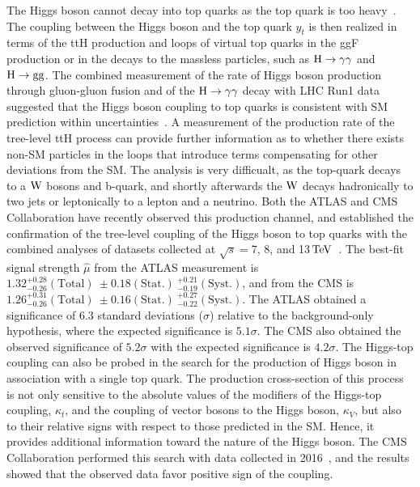 The Higgs boson cannot decay into top quarks as the top quark is too heavy~\cite{LHCTOPWG}. The coupling between the Higgs boson and the top quark $y_{t}$ is then realized in terms of the ttH production and loops of virtual top quarks in the ggF production or in the decays to the massless particles, such as $\mathrm{H}\to\gamma\gamma$ and $\mathrm{H}\to\mathrm{g}\mathrm{g}$. The combined measurement of the rate of Higgs boson production through gluon-gluon fusion and of the $\mathrm{H}\to\gamma\gamma$ decay with LHC Run1 data suggested that the Higgs boson coupling to top quarks is consistent with SM prediction within uncertainties~\cite{Khachatryan:2016vau}. A measurement of the production rate of the tree-level ttH process can provide further information as to whether there exists non-SM particles in the loops that introduce terms compensating for other deviations from the SM. The analysis is very difficualt, as the top-quark decays to a $\mathrm{W}$ bosons and b-quark, and shortly afterwards the $\mathrm{W}$ decays hadronically to two jets or leptonically to a lepton and a neutrino. Both the ATLAS and CMS Collaboration have recently observed this production channel, and established the confirmation of the tree-level coupling of the Higgs boson to top quarks with the combined analyses of datasets collected at $\sqrt{s}=7$, 8, and 13$\,\text{Te\hspace{-.08em}V}$~\cite{Aaboud:2018urx,Sirunyan:2018hoz}. The best-fit signal strength $\hat{\mu}$ from the ATLAS measurement is $1.32^{+0.28}_{-0.26}(\text{Total})\ \pm 0.18(\text{Stat.})\ ^{+0.21}_{-0.19}(\text{Syst.})$, and from the CMS is $1.26^{+0.31}_{-0.26}(\text{Total})\ \pm 0.16(\text{Stat.})\ ^{+0.27}_{-0.22}(\text{Syst.})$. The ATLAS obtained a significance of 6.3 standard deviations ($\sigma$) relative to the background-only hypothesis, where the expected significance is $5.1\sigma$. The CMS also obtained the observed significance of $5.2\sigma$ with the expected significance is $4.2\sigma$. The Higgs-top coupling can also be probed in the search for the production of Higgs boson in association with a single top quark. The production cross-section of this process is not only sensitive to the absolute values of the modifiers of the Higgs-top coupling, $\kappa_{t}$, and the coupling of vector bosons to the Higgs boson, $\kappa_{V}$, but also to their relative signs with respect to those predicted in the SM. Hence, it provides additional information toward the nature of the Higgs boson. The CMS Collaboration performed this search with data collected in 2016~\cite{CMS-PAS-HIG-18-009}, and the results showed that the observed data favor positive sign of the coupling.

